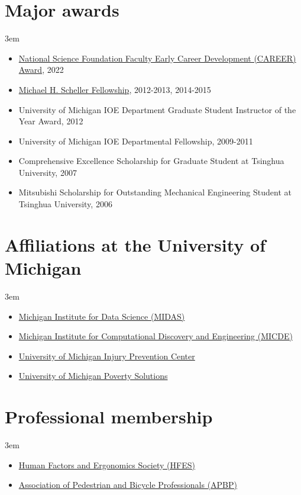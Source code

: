 \documentclass[11pt]{article}
\newenvironment{main}
{\begin{adjustwidth}{3em}{}}
{\end{adjustwidth}}
\begin{document}
\section*{Major awards}
\begin{main}

\begin{itemize}
    \item \href{https://www.nsf.gov/awardsearch/showAward?AWD_ID=2142757}{National Science Foundation Faculty Early Career Development (CAREER) Award}, 2022
    \item \href{https://scholarships.engin.umich.edu/featured/michael-h-scheller-fund/}{Michael H. Scheller Fellowship}, 2012-2013, 2014-2015
    \item University of Michigan IOE Department Graduate Student Instructor of the Year Award, 2012
    \item University of Michigan IOE Departmental Fellowship, 2009-2011
    \item Comprehensive Excellence Scholarship for Graduate Student at Tsinghua University, 2007
    \item Mitsubishi Scholarship for Outstanding Mechanical Engineering Student at Tsinghua University, 2006
\end{itemize}


\end{main}
\section*{Affiliations at the University of Michigan}
\begin{main}

\begin{itemize}
    \item \href{https://midas.umich.edu/}{Michigan Institute for Data Science (MIDAS)}
    \item \href{https://micde.umich.edu/}{Michigan Institute for Computational Discovery and Engineering (MICDE)}
    \item \href{https://injurycenter.umich.edu/}{University of Michigan Injury Prevention Center}
    \item \href{https://poverty.umich.edu/}{University of Michigan Poverty Solutions}
\end{itemize}


\end{main}
\section*{Professional membership}
\begin{main}

\begin{itemize}
    \item \href{https://www.hfes.org/}{Human Factors and Ergonomics Society (HFES)}
    \item \href{https://www.apbp.org/}{Association of Pedestrian and Bicycle Professionals (APBP)}
\end{itemize}


\end{main}
\end{document}
